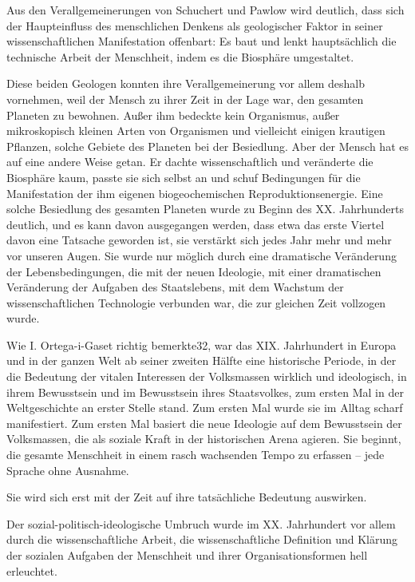 \documentclass[11pt,a4paper]{book}
\begin{document}
Aus den Verallgemeinerungen von Schuchert und Pawlow wird deutlich, dass sich der Haupteinfluss des menschlichen Denkens als geologischer Faktor in seiner wissenschaftlichen Manifestation offenbart: Es baut und lenkt hauptsächlich die technische Arbeit der Menschheit, indem es die Biosphäre umgestaltet. 

Diese beiden Geologen konnten ihre Verallgemeinerung vor allem deshalb vornehmen, weil der Mensch zu ihrer Zeit in der Lage war, den gesamten Planeten zu bewohnen. Außer ihm bedeckte kein Organismus, außer mikroskopisch kleinen Arten von Organismen und vielleicht einigen krautigen Pflanzen, solche Gebiete des Planeten bei der Besiedlung. Aber der Mensch hat es auf eine andere Weise getan. Er dachte wissenschaftlich und veränderte die Biosphäre kaum, passte sie sich selbst an und schuf Bedingungen für die Manifestation der ihm eigenen biogeochemischen Reproduktionsenergie. Eine solche Besiedlung des gesamten Planeten wurde zu Beginn des XX. Jahrhunderts deutlich, und es kann davon ausgegangen werden, dass etwa das erste Viertel davon eine Tatsache geworden ist, sie verstärkt sich jedes Jahr mehr und mehr vor unseren Augen. Sie wurde nur möglich durch eine dramatische Veränderung der Lebensbedingungen, die mit der neuen Ideologie, mit einer dramatischen Veränderung der Aufgaben des Staatslebens, mit dem Wachstum der wissenschaftlichen Technologie verbunden war, die zur gleichen Zeit vollzogen wurde. 

Wie I. Ortega-i-Gaset richtig bemerkte32, war das XIX. Jahrhundert in Europa und in der ganzen Welt ab seiner zweiten Hälfte eine historische Periode, in der die Bedeutung der vitalen Interessen der Volksmassen wirklich und ideologisch, in ihrem Bewusstsein und im Bewusstsein ihres Staatsvolkes, zum ersten Mal in der Weltgeschichte an erster Stelle stand. Zum ersten Mal wurde sie im Alltag scharf manifestiert. Zum ersten Mal basiert die neue Ideologie auf dem Bewusstsein der Volksmassen, die als soziale Kraft in der historischen Arena agieren. Sie beginnt, die gesamte Menschheit in einem rasch wachsenden Tempo zu erfassen -- jede Sprache ohne Ausnahme. 

Sie wird sich erst mit der Zeit auf ihre tatsächliche Bedeutung auswirken. 

Der sozial-politisch-ideologische Umbruch wurde im XX. Jahrhundert vor allem durch die wissenschaftliche Arbeit, die wissenschaftliche Definition und Klärung der sozialen Aufgaben der Menschheit und ihrer Organisationsformen hell erleuchtet. 
\end{document}
